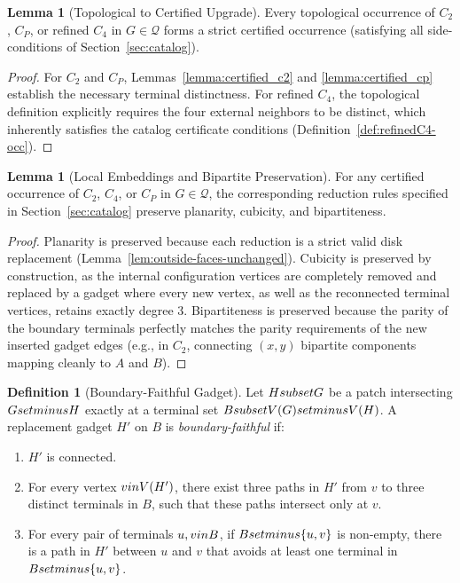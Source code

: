 \documentclass[12pt]{article}
\theoremstyle{definition}
\newtheorem{lemma}[theorem]{Lemma}
\newtheorem{definition}[theorem]{Definition}
\begin{document}
\begin{lemma}[Topological to Certified Upgrade]
\label{lemma:certified_upgrade}
Every topological occurrence of $C_2$, $C_P$, or refined $C_4$ in $G \in \mathcal{Q}$ forms a strict certified occurrence (satisfying all side-conditions of Section~\ref{sec:catalog}).
\end{lemma}
\begin{proof}
For $C_2$ and $C_P$, Lemmas~\ref{lemma:certified_c2} and \ref{lemma:certified_cp} establish the necessary terminal distinctness. For refined $C_4$, the topological definition explicitly requires the four external neighbors to be distinct, which inherently satisfies the catalog certificate conditions (Definition~\ref{def:refinedC4-occ}).
\end{proof}

\begin{lemma}[Local Embeddings and Bipartite Preservation]
\label{lemma:bipartite_planarity_preservation}
For any certified occurrence of $C_2$, $C_4$, or $C_P$ in $G \in \mathcal{Q}$, the corresponding reduction rules specified in Section~\ref{sec:catalog} preserve planarity, cubicity, and bipartiteness.
\end{lemma}
\begin{proof}
Planarity is preserved because each reduction is a strict valid disk replacement (Lemma~\ref{lem:outside-faces-unchanged}). Cubicity is preserved by construction, as the internal configuration vertices are completely removed and replaced by a gadget where every new vertex, as well as the reconnected terminal vertices, retains exactly degree 3. Bipartiteness is preserved because the parity of the boundary terminals perfectly matches the parity requirements of the new inserted gadget edges (e.g., in $C_2$, connecting $(x,y)$ bipartite components mapping cleanly to $A$ and $B$).
\end{proof}

\begin{definition}[Boundary-Faithful Gadget]
\label{def:boundary_faithful}
Let $H \\subset G$ be a patch intersecting $G \\setminus H$ exactly at a terminal set $B \\subset V(G) \\setminus V(H)$. A replacement gadget $H'$ on $B$ is \emph{boundary-faithful} if:
\begin{enumerate}
    \item $H'$ is connected.
    \item For every vertex $v \\in V(H')$, there exist three paths in $H'$ from $v$ to three distinct terminals in $B$, such that these paths intersect only at $v$.
    \item For every pair of terminals $u, v \\in B$, if $B \\setminus \{u, v\}$ is non-empty, there is a path in $H'$ between $u$ and $v$ that avoids at least one terminal in $B \\setminus \{u, v\}$.
\end{enumerate}
\end{definition}
\end{document}
